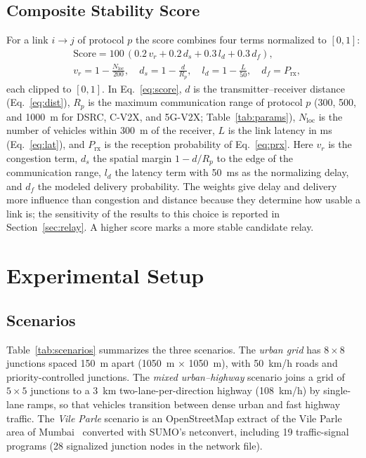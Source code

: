 \documentclass[conference]{IEEEtran}
\begin{document}
\subsection{Composite Stability Score}
For a link $i\to j$ of protocol $p$ the score combines four terms normalized to $[0,1]$:
\begin{equation}
\begin{aligned}
&\mathrm{Score}=100\,(0.2\,v_r+0.2\,d_s+0.3\,l_d+0.3\,d_f),\\
&v_r=1-\tfrac{N_\mathrm{loc}}{200},\quad d_s=1-\tfrac{d}{R_p},\quad l_d=1-\tfrac{L}{50},\quad d_f=P_\mathrm{rx},
\end{aligned}
\label{eq:score}
\end{equation}
each clipped to $[0,1]$. In Eq.~\eqref{eq:score}, $d$ is the transmitter--receiver distance (Eq.~\eqref{eq:dist}), $R_p$ is the maximum communication range of protocol $p$ (300, 500, and 1000~m for DSRC, C-V2X, and 5G-V2X; Table~\ref{tab:params}), $N_\mathrm{loc}$ is the number of vehicles within 300~m of the receiver, $L$ is the link latency in ms (Eq.~\eqref{eq:lat}), and $P_\mathrm{rx}$ is the reception probability of Eq.~\eqref{eq:prx}. Here $v_r$ is the congestion term, $d_s$ the spatial margin $1-d/R_p$ to the edge of the communication range, $l_d$ the latency term with 50~ms as the normalizing delay, and $d_f$ the modeled delivery probability. The weights give delay and delivery more influence than congestion and distance because they determine how usable a link is; the sensitivity of the results to this choice is reported in Section~\ref{sec:relay}. A higher score marks a more stable candidate relay.
 
 
\section{Experimental Setup}
 
\subsection{Scenarios}
Table~\ref{tab:scenarios} summarizes the three scenarios. The \emph{urban grid} has $8\times8$ junctions spaced 150~m apart (1050~m $\times$ 1050~m), with 50~km/h roads and priority-controlled junctions. The \emph{mixed urban--highway} scenario joins a grid of $5\times5$ junctions to a 3~km two-lane-per-direction highway (108~km/h) by single-lane ramps, so that vehicles transition between dense urban and fast highway traffic. The \emph{Vile Parle} scenario is an OpenStreetMap extract of the Vile Parle area of Mumbai~\cite{osm} converted with SUMO's netconvert, including 19 traffic-signal programs (28 signalized junction nodes in the network file).
\end{document}
